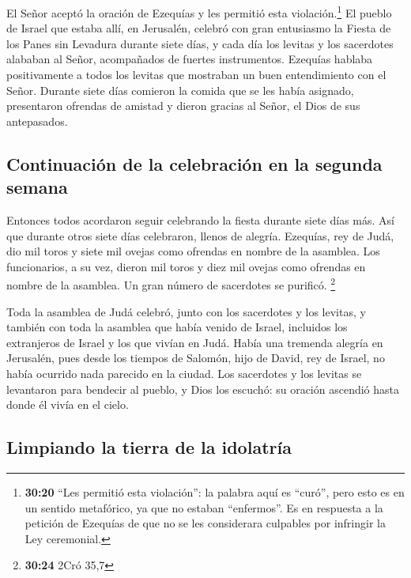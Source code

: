  El Señor aceptó la oración de Ezequías y les permitió
esta violación.\footnote{\textbf{30:20} ``Les permitió esta violación'':
  la palabra aquí es ``curó'', pero esto es en un sentido metafórico, ya
  que no estaban ``enfermos''. Es en respuesta a la petición de Ezequías
  de que no se les considerara culpables por infringir la Ley
  ceremonial.}  El pueblo de Israel que estaba allí, en
Jerusalén, celebró con gran entusiasmo la Fiesta de los Panes sin
Levadura durante siete días, y cada día los levitas y los sacerdotes
alababan al Señor, acompañados de fuertes instrumentos. 
Ezequías hablaba positivamente a todos los levitas que mostraban un buen
entendimiento con el Señor. Durante siete días comieron la comida que se
les había asignado, presentaron ofrendas de amistad y dieron gracias al
Señor, el Dios de sus antepasados.

\hypertarget{continuaciuxf3n-de-la-celebraciuxf3n-en-la-segunda-semana}{%
\subsection{Continuación de la celebración en la segunda
semana}\label{continuaciuxf3n-de-la-celebraciuxf3n-en-la-segunda-semana}}

 Entonces todos acordaron seguir celebrando la fiesta
durante siete días más. Así que durante otros siete días celebraron,
llenos de alegría.  Ezequías, rey de Judá, dio mil toros
y siete mil ovejas como ofrendas en nombre de la asamblea. Los
funcionarios, a su vez, dieron mil toros y diez mil ovejas como ofrendas
en nombre de la asamblea. Un gran número de sacerdotes se purificó.
\footnote{\textbf{30:24} 2Cró 35,7}

 Toda la asamblea de Judá celebró, junto con los
sacerdotes y los levitas, y también con toda la asamblea que había
venido de Israel, incluidos los extranjeros de Israel y los que vivían
en Judá.  Había una tremenda alegría en Jerusalén, pues
desde los tiempos de Salomón, hijo de David, rey de Israel, no había
ocurrido nada parecido en la ciudad.  Los sacerdotes y
los levitas se levantaron para bendecir al pueblo, y Dios los escuchó:
su oración ascendió hasta donde él vivía en el cielo.

\hypertarget{limpiando-la-tierra-de-la-idolatruxeda}{%
\subsection{Limpiando la tierra de la
idolatría}\label{limpiando-la-tierra-de-la-idolatruxeda}}

